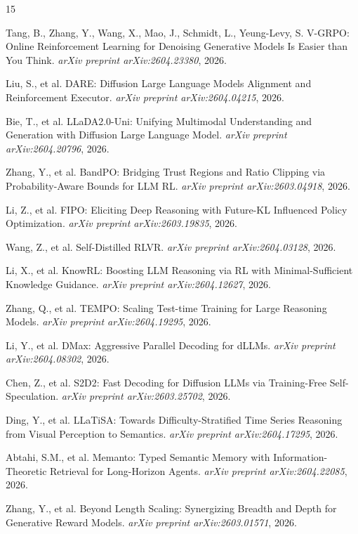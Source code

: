 \documentclass[11pt]{article}
\begin{document}
\begin{thebibliography}{15}

Tang, B., Zhang, Y., Wang, X., Mao, J., Schmidt, L., Yeung-Levy, S.
\newblock V-GRPO: Online Reinforcement Learning for Denoising Generative Models Is Easier than You Think.
\newblock \emph{arXiv preprint arXiv:2604.23380}, 2026.

Liu, S., et al.
\newblock DARE: Diffusion Large Language Models Alignment and Reinforcement Executor.
\newblock \emph{arXiv preprint arXiv:2604.04215}, 2026.

Bie, T., et al.
\newblock LLaDA2.0-Uni: Unifying Multimodal Understanding and Generation with Diffusion Large Language Model.
\newblock \emph{arXiv preprint arXiv:2604.20796}, 2026.

Zhang, Y., et al.
\newblock BandPO: Bridging Trust Regions and Ratio Clipping via Probability-Aware Bounds for LLM RL.
\newblock \emph{arXiv preprint arXiv:2603.04918}, 2026.

Li, Z., et al.
\newblock FIPO: Eliciting Deep Reasoning with Future-KL Influenced Policy Optimization.
\newblock \emph{arXiv preprint arXiv:2603.19835}, 2026.

Wang, Z., et al.
\newblock Self-Distilled RLVR.
\newblock \emph{arXiv preprint arXiv:2604.03128}, 2026.

Li, X., et al.
\newblock KnowRL: Boosting LLM Reasoning via RL with Minimal-Sufficient Knowledge Guidance.
\newblock \emph{arXiv preprint arXiv:2604.12627}, 2026.

Zhang, Q., et al.
\newblock TEMPO: Scaling Test-time Training for Large Reasoning Models.
\newblock \emph{arXiv preprint arXiv:2604.19295}, 2026.

Li, Y., et al.
\newblock DMax: Aggressive Parallel Decoding for dLLMs.
\newblock \emph{arXiv preprint arXiv:2604.08302}, 2026.

Chen, Z., et al.
\newblock S2D2: Fast Decoding for Diffusion LLMs via Training-Free Self-Speculation.
\newblock \emph{arXiv preprint arXiv:2603.25702}, 2026.

Ding, Y., et al.
\newblock LLaTiSA: Towards Difficulty-Stratified Time Series Reasoning from Visual Perception to Semantics.
\newblock \emph{arXiv preprint arXiv:2604.17295}, 2026.

Abtahi, S.M., et al.
\newblock Memanto: Typed Semantic Memory with Information-Theoretic Retrieval for Long-Horizon Agents.
\newblock \emph{arXiv preprint arXiv:2604.22085}, 2026.

Zhang, Y., et al.
\newblock Beyond Length Scaling: Synergizing Breadth and Depth for Generative Reward Models.
\newblock \emph{arXiv preprint arXiv:2603.01571}, 2026.

\end{thebibliography}
\end{document}
